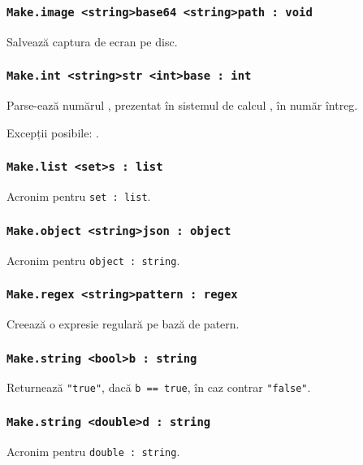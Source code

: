 \subsubsection{\lstinline|Make.image <string>base64 <string>path : void|}

Salvează captura de ecran pe disc.

\subsubsection{\lstinline|Make.int <string>str <int>base : int|}

Parse-ează numărul , prezentat în sistemul de calcul , în număr întreg.

Excepții posibile: .

\subsubsection{\lstinline|Make.list <set>s : list|}

Acronim pentru \lstinline|set : list|.

\subsubsection{\lstinline|Make.object <string>json : object|}

Acronim pentru \lstinline|object : string|.

\subsubsection{\lstinline|Make.regex <string>pattern : regex|}

Creează o expresie regulară pe bază de patern.

\subsubsection{\lstinline|Make.string <bool>b : string|}

Returnează \lstinline|"true"|, dacă \lstinline|b == true|, în caz contrar \lstinline|"false"|.

\subsubsection{\lstinline|Make.string <double>d : string|}

Acronim pentru \lstinline|double : string|.

